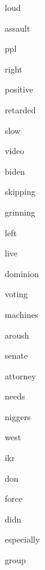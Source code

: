 \documentclass[varwidth]{standalone}
\begin{document}
\begin{CJK*}{UTF8}{gbsn}
{{{\colorbox{red!1.561431884765625}{\strut loud}
\colorbox{red!0.6949684619903564}{\strut assault}
\colorbox{red!11.82334041595459}{\strut ppl}
\colorbox{red!2.237910270690918}{\strut right}
\colorbox{red!4.2014994621276855}{\strut positive}
\colorbox{red!4.835478782653809}{\strut retarded}
\colorbox{red!1.963059425354004}{\strut slow}
\colorbox{red!0.9976511001586914}{\strut video}
\colorbox{red!8.230109214782715}{\strut biden}
\colorbox{red!6.141262054443359}{\strut skipping}
\colorbox{red!1.178441047668457}{\strut grinning}
\colorbox{red!0.2525653839111328}{\strut left}
\colorbox{red!1.2970256805419922}{\strut live}
\colorbox{red!7.732475280761719}{\strut dominion}
\colorbox{red!3.046205520629883}{\strut voting}
\colorbox{red!0.27138614654541016}{\strut machines}
\colorbox{red!9.035661697387695}{\strut aroush}
\colorbox{red!1.7787256240844727}{\strut senate}
\colorbox{red!2.2269840240478516}{\strut attorney}
\colorbox{red!1.2061691284179688}{\strut needs}
\colorbox{red!8.859281539916992}{\strut niggers}
\colorbox{red!0.419705867767334}{\strut west}
\colorbox{red!11.888845443725586}{\strut ikr}
\colorbox{red!2.954922676086426}{\strut don}
\colorbox{red!2.576054573059082}{\strut force}
\colorbox{red!0.7412223815917969}{\strut didn}
\colorbox{red!0.8278255462646484}{\strut especially}
\colorbox{red!3.0958614349365234}{\strut group}

}}}
\end{CJK*}
\end{document}
